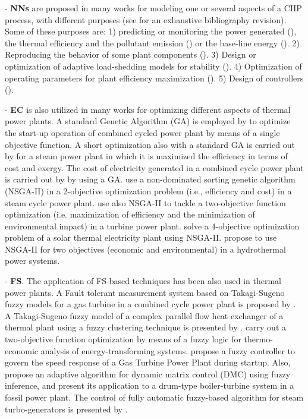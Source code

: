 \bigskip
\par
- \textbf{NNs} are proposed in many works for modeling one or several aspects of a CHP process, with different purposes  (see \cite{Rossi-2014} for an exhaustive bibliography revision). Some of these purposes are: 1) predicting or monitoring the power generated (\cite{De-2007,Smrekar-2010,Nikpey-2013,Sisworahardjo-2013}), the thermal efficiency and the pollutant emission (\cite{Flynn-2005,Pan-2007}) or the base-line energy (\cite{Rossi-2014}). 2) Reproducing the behavior of some plant components (\cite{Bekat-2012}). 3) Design or optimization of adaptive load-shedding models for stability (\cite{Kumar-2013}). 4) Optimization of operating parameters for plant efficiency maximization (\cite{Zomo-2011,Arslam-2011}). 5) Design of controllers (\cite{Wang-2008,Lee-2010}).


\bigskip
\par
- \textbf{EC} is also utilized in many works for optimizing different aspects of thermal power plants. A standard Genetic Algorithm (GA) is employed by \cite{Bertini-12} to optimize the start-up operation of combined cycled power plant by means of a single objective function. A short optimization also with a standard GA is carried out by \cite{Ameri-09} for a steam power plant in which it is maximized the efficiency in terms of cost and exergy. The cost of electricity generated in a combined cycle power plant is carried out by \cite{Koch-2007} by using a GA. \cite{Haja-2012} use a non-dominated sorting genetic algorithm (NSGA-II) in a 2-objective optimization problem (i.e., efficiency and cost) in a steam cycle power plant. \cite{Ahmadi-2011} use also NSGA-II to tackle a two-objective function optimization (i.e. maximization of efficiency and the minimization of environmental impact) in a turbine power plant. \cite{Deb2012} solve a 4-objective optimization problem of a solar thermal electricity plant using NSGA-II. \cite{Basu-11} propose to use NSGA-II for two objectives (economic and environmental) in a hydrothermal power systems. 

\bigskip
\par
- \textbf{FS}. The application of FS-based techniques has been also used in thermal power plants. A Fault tolerant measurement system based on Takagi-Sugeno fuzzy models for a gas turbine in a combined cycle power plant is proposed by \cite{Berrios-2011}. A Takagi-Sugeno fuzzy model of a complex parallel flow heat exchanger of a thermal plant using a fuzzy clustering technique is presented by \cite{Habi-2011}. \cite{Mazur-2009} carry out a two-objective function optimization by means of a fuzzy logic for thermo-economic analysis of energy-transforming systems. \cite{Rodriguez-Martinez-2011} propose a fuzzy controller to govern the speed response of a Gas Turbine Power Plant during startup. Also, \cite{Moon-2011} propose an adaptive algorithm for dynamic matrix control (DMC) using fuzzy inference, and present its application to a drum-type boiler-turbine system in a fossil power plant. The control of fully automatic fuzzy-based algorithm for steam turbo-generators is presented by \cite{Gunes-2010}.

